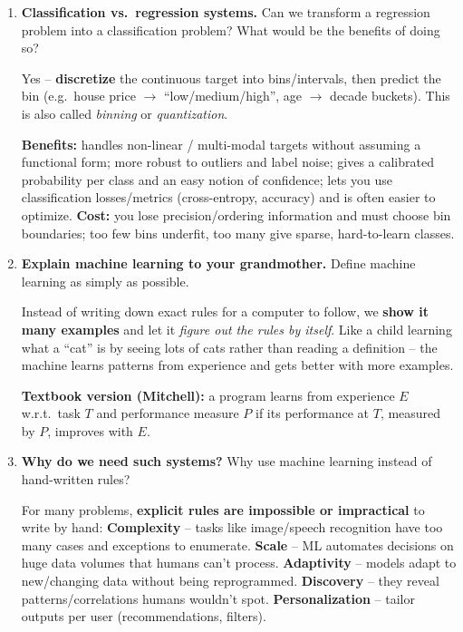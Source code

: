 \documentclass[10pt,a4paper]{article}
\newcommand{\q}[1]{\item #1}
\begin{document}
\begin{enumerate}[leftmargin=*,label=\textbf{Q\arabic*.}]
\q \textbf{Classification vs.\ regression systems.} Can we transform a regression problem into a classification problem? What would be the benefits of doing so?
\begin{answerbox}
Yes -- \textbf{discretize} the continuous target into bins/intervals, then predict the bin (e.g.\ house price $\to$ ``low/medium/high'', age $\to$ decade buckets). This is also called \emph{binning} or \emph{quantization}.

\textbf{Benefits:} handles non-linear / multi-modal targets without assuming a functional form; more robust to outliers and label noise; gives a calibrated probability per class and an easy notion of confidence; lets you use classification losses/metrics (cross-entropy, accuracy) and is often easier to optimize.
\textbf{Cost:} you lose precision/ordering information and must choose bin boundaries; too few bins underfit, too many give sparse, hard-to-learn classes.
\end{answerbox}

\q \textbf{Explain machine learning to your grandmother.} Define machine learning as simply as possible.
\begin{answerbox}
Instead of writing down exact rules for a computer to follow, we \textbf{show it many examples} and let it \emph{figure out the rules by itself}. Like a child learning what a ``cat'' is by seeing lots of cats rather than reading a definition -- the machine learns patterns from experience and gets better with more examples.

\textbf{Textbook version (Mitchell):} a program learns from experience $E$ w.r.t.\ task $T$ and performance measure $P$ if its performance at $T$, measured by $P$, improves with $E$.
\end{answerbox}

\q \textbf{Why do we need such systems?} Why use machine learning instead of hand-written rules?
\begin{answerbox}
For many problems, \textbf{explicit rules are impossible or impractical} to write by hand:
\textbf{Complexity} -- tasks like image/speech recognition have too many cases and exceptions to enumerate.
\textbf{Scale} -- ML automates decisions on huge data volumes that humans can't process.
\textbf{Adaptivity} -- models adapt to new/changing data without being reprogrammed.
\textbf{Discovery} -- they reveal patterns/correlations humans wouldn't spot.
\textbf{Personalization} -- tailor outputs per user (recommendations, filters).
\end{answerbox}


\end{enumerate}
\end{document}
